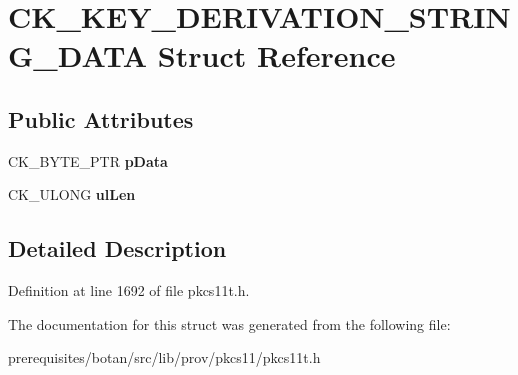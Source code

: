 \hypertarget{struct_c_k___k_e_y___d_e_r_i_v_a_t_i_o_n___s_t_r_i_n_g___d_a_t_a}{}\section{C\+K\+\_\+\+K\+E\+Y\+\_\+\+D\+E\+R\+I\+V\+A\+T\+I\+O\+N\+\_\+\+S\+T\+R\+I\+N\+G\+\_\+\+D\+A\+TA Struct Reference}
\label{struct_c_k___k_e_y___d_e_r_i_v_a_t_i_o_n___s_t_r_i_n_g___d_a_t_a}
\subsection*{Public Attributes}
\begin{DoxyCompactItemize}
\item 
\mbox{\label{struct_c_k___k_e_y___d_e_r_i_v_a_t_i_o_n___s_t_r_i_n_g___d_a_t_a_aec743fb0867bb539ae70ab008e17c27b}} 
C\+K\+\_\+\+B\+Y\+T\+E\+\_\+\+P\+TR {\bfseries p\+Data}
\item 
\mbox{\label{struct_c_k___k_e_y___d_e_r_i_v_a_t_i_o_n___s_t_r_i_n_g___d_a_t_a_a11068ec8d8e05a164dd2bb2bbeddf924}} 
C\+K\+\_\+\+U\+L\+O\+NG {\bfseries ul\+Len}
\end{DoxyCompactItemize}


\subsection{Detailed Description}


Definition at line 1692 of file pkcs11t.\+h.



The documentation for this struct was generated from the following file\+:\begin{DoxyCompactItemize}
\item 
prerequisites/botan/src/lib/prov/pkcs11/pkcs11t.\+h\end{DoxyCompactItemize}
